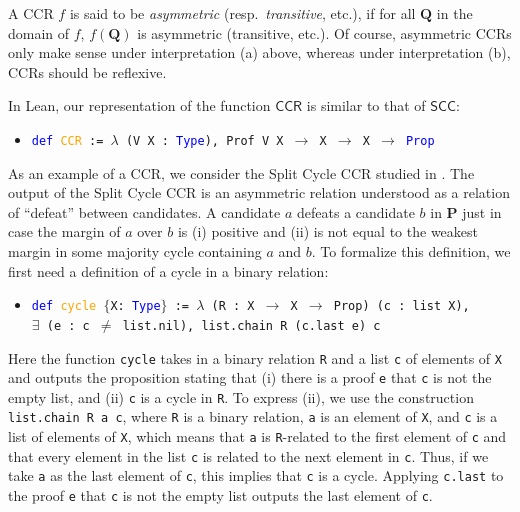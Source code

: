 \documentclass[runningheads]{llncs}
\begin{document}
A CCR $f$ is said to be \textit{asymmetric} (resp.~\textit{transitive}, etc.), if for all $\mathbf{Q}$ in the domain of $f$, $f(\mathbf{Q})$ is asymmetric (transitive, etc.). Of course, asymmetric CCRs only make sense under interpretation (a) above, whereas under interpretation (b), CCRs should be reflexive.

In Lean, our representation of the function $\mathsf{CCR}$ is similar to that of $\mathsf{SCC}$:
\begin{itemize}
\item[] \texttt{\textcolor{blue}{def} \textcolor{orange}{CCR} := $\lambda$ (V X : \textcolor{blue}{Type}), Prof V X $\to$ X $\to$ X $\to$ \textcolor{blue}{Prop}}
\end{itemize}

\begin{example}\label{SplitCycleEx1} As an example of a CCR, we consider the Split Cycle CCR studied in \cite{}. The output of the Split Cycle CCR is an asymmetric relation understood as a relation of ``defeat'' between candidates. A candidate $a$ defeats a candidate $b$ in $\mathbf{P}$ just in case the margin of $a$ over $b$ is (i) positive and (ii) is not equal to the weakest margin in some majority cycle containing $a$ and $b$. To formalize this definition, we first need a definition of a cycle in a binary relation:
\begin{itemize}
\item[] \texttt{\textcolor{blue}{def} \textcolor{orange}{cycle} $\{$X: \textcolor{blue}{Type}$\}$ := $\lambda$ (R : X $\to$ X $\to$ Prop) (c : list X), \\
$\exists$ (e : c $\neq$ list.nil), list.chain R (c.last e) c}
\end{itemize}
Here the function \texttt{cycle} takes in a binary relation \texttt{R} and a list \texttt{c} of elements of \texttt{X} and outputs the proposition stating that (i) there is a proof \texttt{e} that \texttt{c} is not the empty list, and (ii) \texttt{c} is a cycle in \texttt{R}. To express (ii), we use the construction \texttt{list.chain R a c}, where \texttt{R} is a binary relation, \texttt{a} is an element of \texttt{X}, and \texttt{c} is a list of elements of \texttt{X}, which means that \texttt{a} is \texttt{R}-related to the first element of \texttt{c} and that every element in the list \texttt{c} is related to the next element in \texttt{c}. Thus, if we take \texttt{a} as the last element of \texttt{c}, this implies that \texttt{c} is a cycle. Applying \texttt{c.last} to the proof \texttt{e} that \texttt{c} is not the empty list outputs the last element of \texttt{c}.


\end{example}
\end{document}
